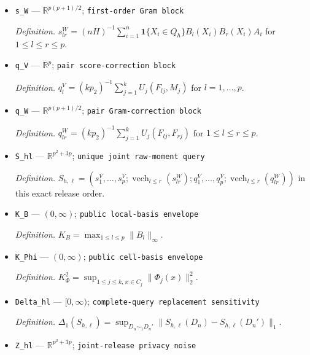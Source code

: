 \documentclass{article}
\begin{document}
\begin{itemize}
  \par\smallskip\noindent\emph{Definition.} \(s_l^V=(nH)^{-1}\sum_{i=1}^n\mathbf 1\{X_i\in Q_h\}B_l(X_i)A_iY_i\) for \(l=1,\ldots,p\).
  \item \texttt{s\_\allowbreak{}W} --- \(\mathbb R^{p(p+1)/2}\); \texttt{first-\allowbreak{}order Gram block}
  \par\smallskip\noindent\emph{Definition.} \(s_{lr}^W=(nH)^{-1}\sum_{i=1}^n\mathbf 1\{X_i\in Q_h\}B_l(X_i)B_r(X_i)A_i\) for \(1\le l\le r\le p\).
  \item \texttt{q\_\allowbreak{}V} --- \(\mathbb R^p\); \texttt{pair score-\allowbreak{}correction block}
  \par\smallskip\noindent\emph{Definition.} \(q_l^V=(kp_2)^{-1}\sum_{j=1}^kU_j(F_{lj},M_j)\) for \(l=1,\ldots,p\).
  \item \texttt{q\_\allowbreak{}W} --- \(\mathbb R^{p(p+1)/2}\); \texttt{pair Gram-\allowbreak{}correction block}
  \par\smallskip\noindent\emph{Definition.} \(q_{lr}^W=(kp_2)^{-1}\sum_{j=1}^kU_j(F_{lj},F_{rj})\) for \(1\le l\le r\le p\).
  \item \texttt{S\_\allowbreak{}hl} --- \(\mathbb R^{p^2+3p}\); \texttt{unique joint raw-\allowbreak{}moment query}
  \par\smallskip\noindent\emph{Definition.} \(S_{h,\ell}=(s_1^V,\ldots,s_p^V;\operatorname{vech}_{l\le r}(s_{lr}^W);q_1^V,\ldots,q_p^V;\operatorname{vech}_{l\le r}(q_{lr}^W))\) in this exact release order.
  \item \texttt{K\_\allowbreak{}B} --- \((0,\infty)\); \texttt{public local-\allowbreak{}basis envelope}
  \par\smallskip\noindent\emph{Definition.} \(K_B=\max_{1\le l\le p}\lVert B_l\rVert_\infty\).
  \item \texttt{K\_\allowbreak{}Phi} --- \((0,\infty)\); \texttt{public cell-\allowbreak{}basis envelope}
  \par\smallskip\noindent\emph{Definition.} \(K_\Phi^2=\sup_{1\le j\le k,\,x\in C_j}\lVert\Phi_j(x)\rVert_2^2\).
  \item \texttt{Delta\_\allowbreak{}hl} --- \([0,\infty)\); \texttt{complete-\allowbreak{}query replacement sensitivity}
  \par\smallskip\noindent\emph{Definition.} \(\Delta_1(S_{h,\ell})=\sup_{D_n\sim_1D_n'}\lVert S_{h,\ell}(D_n)-S_{h,\ell}(D_n')\rVert_1\).
  \item \texttt{Z\_\allowbreak{}hl} --- \(\mathbb R^{p^2+3p}\); \texttt{joint-\allowbreak{}release privacy noise}

\end{itemize}
\end{document}
